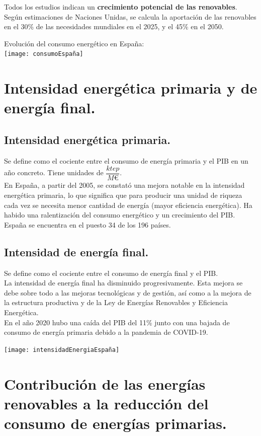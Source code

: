 	\indent Todos los estudios indican un \textbf{crecimiento potencial de las renovables}. Según estimaciones de Naciones Unidas, se calcula la aportación de las renovables en el 30\% de las necesidades mundiales
	en el 2025, y el 45\% en el 2050.

	Evolución del consumo energético en España:\\
	\texttt{[image: consumoEspaña]}

\section{Intensidad energética primaria y de energía final.}
	\subsection{Intensidad energética primaria.}
		Se define como el cociente entre el consumo de energía primaria y el PIB en un año concreto. Tiene unidades de $\dfrac{\textit{ktep}}{\textit{M€}}$.\\
		\indent En España, a partir del 2005, se constató una mejora notable en la
		intensidad energética primaria, lo que significa que para producir una
		unidad de riqueza cada vez se necesita menor cantidad de energía (mayor
		eficiencia energética). Ha habido una ralentización del consumo energético y un
		crecimiento del PIB. España se encuentra en el puesto 34 de los 196 países.
		
	\subsection{Intensidad de energía final.}
		Se define como el cociente entre el consumo de energía final y el PIB.\\
		\indent La intensidad de energía final ha disminuido progresivamente. Esta mejora se debe sobre todo
		a las mejoras tecnológicas y de gestión, así como a la mejora de la estructura productiva y de la Ley de Energías Renovables y Eficiencia Energética.\\
		\indent En el año 2020 hubo una caída del PIB del 11\% junto con una bajada de consumo de energía primaria debido a la pandemia de COVID-19.
		
	\texttt{[image: intensidadEnergiaEspaña]}

\section{Contribución de las energías renovables a la reducción del consumo de energías primarias.}
